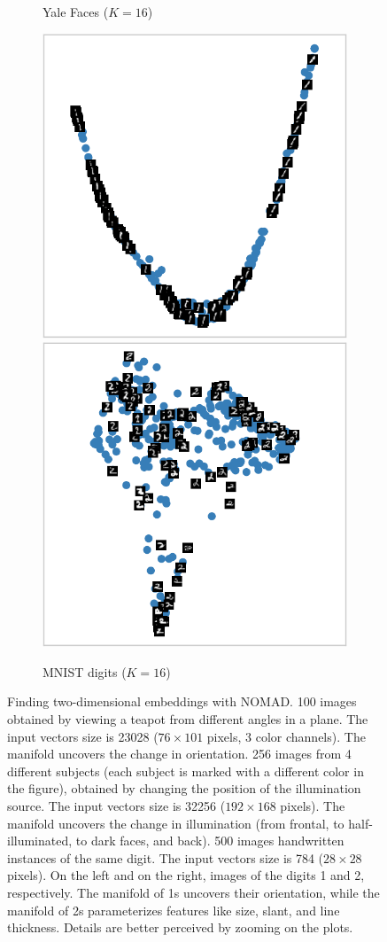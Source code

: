\documentclass[twoside,11pt]{article}
\begin{document}
\begin{figure}[p]
\begin{subfigure}[t]{.24\textwidth}
		\caption{Yale Faces ($K = 16$)}
		\label{fig:embedding_real_faces}
	\end{subfigure}%
	\hfill%
	\begin{subfigure}[t]{.48\textwidth}
		\centering
		\includegraphics[width=.5\linewidth]{embedding/mnist1_embedding}%
		\includegraphics[width=.5\linewidth]{embedding/mnist2_embedding}
		
		\caption{MNIST digits  ($K = 16$)}
		\label{fig:embedding_real_mnist}
	\end{subfigure}
	
	\caption{Finding two-dimensional embeddings with NOMAD.
		\protect{} 100 images obtained by viewing a teapot from different angles in a plane. The input vectors size is 23028 ($76 \times 101$ pixels, 3 color channels). The manifold uncovers the change in orientation.
		\protect{} 256 images from 4 different subjects (each subject is marked with a different color in the figure), obtained by changing the position of the illumination source.  The input vectors size is 32256 ($192 \times 168$ pixels).  The manifold uncovers the change in illumination (from frontal, to half-illuminated, to dark faces, and back).
		\protect{} 500 images handwritten instances of the same digit.  The input vectors size is 784 ($28 \times 28$ pixels). On the left and on the right, images of the digits 1 and 2, respectively. The manifold of 1s uncovers their orientation, while the manifold of 2s parameterizes features like size, slant, and line thickness.
		Details are better perceived by zooming on the plots.
	}
	\label{fig:embedding_real}
\end{figure}
\end{document}
